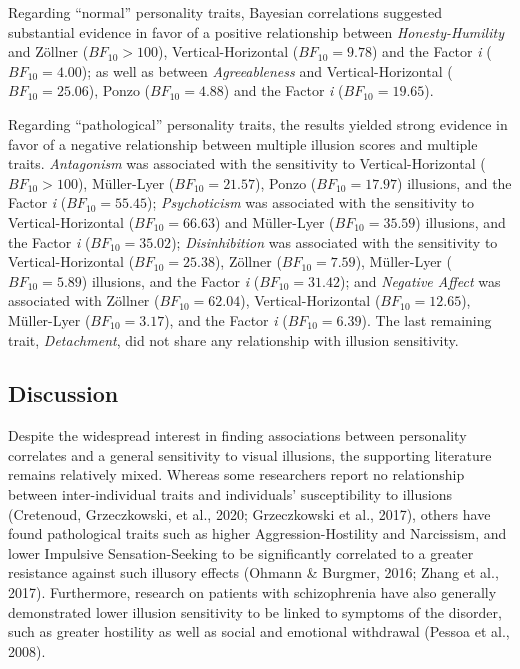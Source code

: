 \documentclass[
  man,floatsintext]{apa6}
\begin{document}
Regarding ``normal'' personality traits, Bayesian correlations suggested substantial evidence in favor of a positive relationship between \emph{Honesty-Humility} and Zöllner (\(BF_{10} > 100\)), Vertical-Horizontal (\(BF_{10} = 9.78\)) and the Factor \emph{i} (\(BF_{10} = 4.00\)); as well as between \emph{Agreeableness} and Vertical-Horizontal (\(BF_{10} = 25.06\)), Ponzo (\(BF_{10} = 4.88\)) and the Factor \emph{i} (\(BF_{10} = 19.65\)).

Regarding ``pathological'' personality traits, the results yielded strong evidence in favor of a negative relationship between multiple illusion scores and multiple traits. \emph{Antagonism} was associated with the sensitivity to Vertical-Horizontal (\(BF_{10} > 100\)), Müller-Lyer (\(BF_{10} = 21.57\)), Ponzo (\(BF_{10} = 17.97\)) illusions, and the Factor \emph{i} (\(BF_{10} = 55.45\)); \emph{Psychoticism} was associated with the sensitivity to Vertical-Horizontal (\(BF_{10} = 66.63\)) and Müller-Lyer (\(BF_{10} = 35.59\)) illusions, and the Factor \emph{i} (\(BF_{10} = 35.02\)); \emph{Disinhibition} was associated with the sensitivity to Vertical-Horizontal (\(BF_{10} = 25.38\)), Zöllner (\(BF_{10} = 7.59\)), Müller-Lyer (\(BF_{10} = 5.89\)) illusions, and the Factor \emph{i} (\(BF_{10} = 31.42\)); and \emph{Negative Affect} was associated with Zöllner (\(BF_{10} = 62.04\)), Vertical-Horizontal (\(BF_{10} = 12.65\)), Müller-Lyer (\(BF_{10} = 3.17\)), and the Factor \emph{i} (\(BF_{10} = 6.39\)). The last remaining trait, \emph{Detachment}, did not share any relationship with illusion sensitivity.

\hypertarget{discussion-2}{%
\subsection{Discussion}\label{discussion-2}}

Despite the widespread interest in finding associations between personality correlates and a general sensitivity to visual illusions, the supporting literature remains relatively mixed. Whereas some researchers report no relationship between inter-individual traits and individuals' susceptibility to illusions (Cretenoud, Grzeczkowski, et al., 2020; Grzeczkowski et al., 2017), others have found pathological traits such as higher Aggression-Hostility and Narcissism, and lower Impulsive Sensation-Seeking to be significantly correlated to a greater resistance against such illusory effects (Ohmann \& Burgmer, 2016; Zhang et al., 2017). Furthermore, research on patients with schizophrenia have also generally demonstrated lower illusion sensitivity to be linked to symptoms of the disorder, such as greater hostility as well as social and emotional withdrawal (Pessoa et al., 2008).
\end{document}
